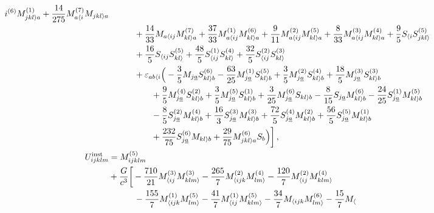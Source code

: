 \documentclass[prd,preprint,superscriptaddress,tightenlines,nofootinbib,
  eqsecnum,showpacs]{revtex4}
\begin{document}
\begin{subequations}
\begin{align}
{    i}^{(6)} M_{jkl \rangle a}^{(1)} + \frac{14}{275} M_{a \langle
    i}^{(7)} M_{jkl \rangle a} \nonumber \\ & \quad\qquad +
  \frac{14}{33} M_{a \langle ij} M_{kl \rangle a}^{(7)} +
  \frac{37}{33} M_{a \langle ij}^{(1)} M_{kl \rangle a}^{(6)} +
  \frac{9}{11} M_{a \langle ij}^{(2)} M_{kl \rangle a}^{(5)} +
  \frac{8}{33} M_{a \langle ij}^{(3)} M_{kl \rangle a}^{(4)} +
  \frac{9}{5} S_{\langle i} S_{jkl \rangle}^{(5)} \nonumber \\ &
  \quad\qquad + \frac{16}{5} S_{\langle ij} S_{kl \rangle}^{(5)} +
  \frac{48}{5} S_{\langle ij}^{(1)} S_{kl \rangle}^{(4)} +
  \frac{32}{5} S_{\langle ij}^{(2)} S_{kl \rangle}^{(3)} \nonumber
  \\ & \quad\qquad + \varepsilon_{ab \langle i} \Big(- \frac{3}{5}
  M_{j\underline{a}} S_{kl \rangle b}^{(6)} - \frac{63}{25}
  M_{j\underline{a}}^{(1)} S_{kl \rangle b}^{(5)} + \frac{3}{5}
  M_{j\underline{a}}^{(2)} S_{kl \rangle b}^{(4)} + \frac{18}{5}
  M_{j\underline{a}}^{(3)} S_{kl \rangle b}^{(3)} \nonumber \\ &
  \quad\qquad\qquad + \frac{9}{5} M_{j\underline{a}}^{(4)} S_{kl
    \rangle b}^{(2)} + \frac{3}{5} M_{j\underline{a}}^{(5)} S_{kl
    \rangle b}^{(1)} + \frac{3}{25} M_{j\underline{a}}^{(6)} S_{kl
    \rangle b} - \frac{8}{15} S_{j\underline{a}} M_{kl \rangle
    b}^{(6)} - \frac{24}{25} S_{j\underline{a}}^{(1)} M_{kl \rangle
    b}^{(5)} \nonumber \\ & \quad\qquad\qquad - \frac{8}{5}
  S_{j\underline{a}}^{(2)} M_{kl \rangle b}^{(4)} + \frac{16}{3}
  S_{j\underline{a}}^{(3)} M_{kl \rangle b}^{(3)} + \frac{72}{5}
  S_{j\underline{a}}^{(4)} M_{kl \rangle b}^{(2)} + \frac{56}{5}
  S_{j\underline{a}}^{(5)} M_{kl \rangle b}^{(1)} \nonumber \\ &
  \quad\qquad\qquad + \frac{232}{75} S_{j\underline{a}}^{(6)} M_{kl
    \rangle b} + \frac{29}{75} M_{jkl \rangle a}^{(6)} S_b \Big)
  \bigg] \,,\\
U_{ijklm}^\text{inst} &= M^{(5)}_{ijklm} \nonumber \\ &+ {G\over
  c^3}\bigg[ -{710\over21}M^{(3)}_{\langle
    ij}M^{(3)}_{klm\rangle}-{265\over7}M^{(2)}_{\langle
    ijk}M^{(4)}_{lm\rangle} -{120\over7}M^{(2)}_{\langle
    ij}M^{(4)}_{klm\rangle}\nonumber\\ & \quad\qquad
  -{155\over7}M^{(1)}_{\langle
    ijk}M^{(5)}_{lm\rangle}-{41\over7}M^{(1)}_{\langle
    ij}M^{(5)}_{klm\rangle} -{34\over7}M_{\langle
    ijk}M^{(6)}_{lm\rangle}-{15\over7}M_{\langle
}
\end{align}
\end{subequations}
\end{document}
